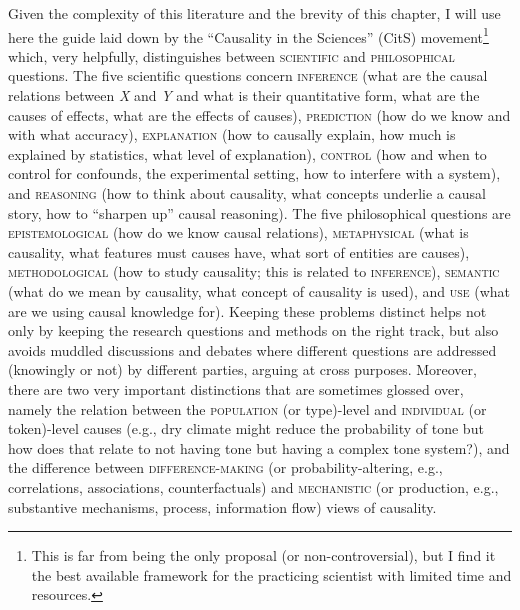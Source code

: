 \documentclass[output=paper]{langsci/langscibook}
\begin{document}
Given the complexity of this literature and the brevity of this chapter, I will use here the guide laid down by the “Causality in the Sciences” (CitS) movement\footnote{This is far from being the only proposal (or non-controversial), but I find it the best available framework for the practicing scientist with limited time and resources.} \citep{Illari2011,Illari2014} which, very helpfully, distinguishes between \textsc{scientific} and \textsc{philosophical} questions. The five scientific questions concern \textsc{inference} (what are the causal relations between \textit{X} and \textit{Y} and what is their quantitative form, what are the causes of effects, what are the effects of causes), \textsc{prediction} (how do we know and with what accuracy), \textsc{explanation} (how to causally explain, how much is explained by statistics, what level of explanation), \textsc{control} (how and when to control for confounds, the experimental setting, how to interfere with a system), and \textsc{reasoning} (how to think about causality, what concepts underlie a causal story, how to “sharpen up” causal reasoning). The five philosophical questions are \textsc{epistemological} (how do we know causal relations), \textsc{metaphysical} (what is causality, what features must causes have, what sort of entities are causes), \textsc{methodological} (how to study causality; this is related to \textsc{inference}), \textsc{semantic} (what do we mean by causality, what concept of causality is used), and \textsc{use} (what are we using causal knowledge for). Keeping these problems distinct helps not only by keeping the research questions and methods on the right track, but also avoids muddled discussions and debates where different questions are addressed (knowingly or not) by different parties, arguing at cross purposes. Moreover, there are two very important distinctions that are sometimes glossed over, namely the relation between the \textsc{population} (or type)-level and \textsc{individual} (or token)-level causes (e.g., dry climate might reduce the probability of tone but how does that relate to  not having tone but  having a complex tone system?), and the difference between \textsc{difference-making} (or probability-altering, e.g., correlations, associations, counterfactuals) and \textsc{mechanistic} (or production, e.g., substantive mechanisms, process, information flow) views of causality.
\end{document}
